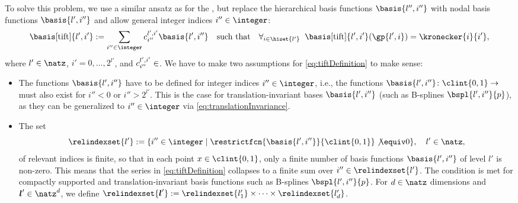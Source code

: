 To solve this problem,
we use a similar ansatz as for the \hftr,
but replace the hierarchical basis functions $\basis{l'',i''}$
with nodal basis functions $\basis{l',i''}$ and
allow general integer indices $i'' \in \integer$:
\begin{equation}
  \label{eq:tiftDefinition}
  \basis[\tift]{l',i'}
  := \sum_{i'' \in \integer} c_{i''}^{l',i'} \basis{l',i''}
  \quad\text{such that}\quad
  \falarge{i \in \hiset{l'}}{
    \basis[\tift]{l',i'}(\gp{l',i}) = \kronecker{i}{i'},
  }
\end{equation}
where $l' \in \natz$, $i' = 0, \dotsc, 2^{l'}$, and
$c_{i''}^{l',i'} \in \real$.
We have to make two assumptions for \eqref{eq:tiftDefinition} to make sense:

\begin{itemize}
  \item
  The functions $\basis{l',i''}$ have to be defined for integer indices
  $i'' \in \integer$, i.e.,
  the functions $\basis{l',i''}\colon \clint{0, 1} \to \real$
  must also exist for $i'' < 0$ or $i'' > 2^{l'}$.
  This is the case for translation-invariant bases
  $\basis{l',i''}$ (such as B-splines $\bspl{l',i''}{p}$),
  as they can be generalized to $i'' \in \integer$
  via \cref{eq:translationInvariance}.
  
  \item
  The set
  \begin{equation}
    \relindexset{l'}
    := \{i'' \in \integer \mid
    \restrictfcn{\basis{l',i''}}{\clint{0, 1}} \not\equiv 0\},\quad
    l' \in \natz,
  \end{equation}
  of relevant indices is finite, so that in each point $x \in \clint{0, 1}$,
  only a finite number of basis functions $\basis{l',i''}$ of level $l'$
  is non-zero.
  This means that the series in \eqref{eq:tiftDefinition} collapses to a
  finite sum over $i'' \in \relindexset{l'}$.
  The condition is met for compactly supported and translation-invariant
  basis functions such as B-splines $\bspl{l',i''}{p}$.
  For $d \in \natz$ dimensions and $\*l' \in \natz^d$, we define
  $\relindexset{\*l'} :=
  \relindexset{l'_1} \times \dotsb \times \relindexset{l'_d}$.
\end{itemize}

